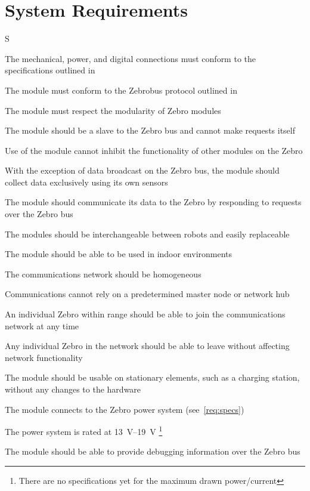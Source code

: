\section{System Requirements}
\begin{reqs}{S}
  \item\label{req:specs} The mechanical, power, and digital connections must conform to the specifications outlined in~\cite{DeciSpecs}

  \item The module must conform to the Zebrobus protocol outlined in~\cite{Zebrobus}

  \item The module must respect the modularity of Zebro modules
    \begin{subreqs}
    \item The module should be a slave to the Zebro bus and cannot make requests itself
      \item\label{req:inhibition} Use of the module cannot inhibit the functionality of other modules on the Zebro
      \item With the exception of data broadcast on the Zebro bus, the module should collect data exclusively using its own sensors
      \item The module should communicate its data to the Zebro by responding to requests over the Zebro bus
      \item The modules should be interchangeable between robots and easily replaceable
    \end{subreqs}

  \item The module should be able to be used in indoor environments

  \item The communications network should be homogeneous
    \begin{subreqs}
      \item Communications cannot rely on a predetermined master node or network hub
      \item An individual Zebro within range should be able to join the communications network at any time
      \item Any individual Zebro in the network should be able to leave without affecting network functionality
    \end{subreqs}

  \item\label{req:stationary} The module should be usable on stationary elements, such as a charging station, without any changes to the hardware

  \item The module connects to the Zebro power system (see~\ref{req:specs})
    \begin{subreqs}
      \item\label{req:volt}The power system is rated at \SIrange{13}{19}{\volt}
      \footnote{There are no specifications yet for the maximum drawn power/current}
    \end{subreqs}

  \item\label{req:debug} The module should be able to provide debugging information over the Zebro bus
\end{reqs}

